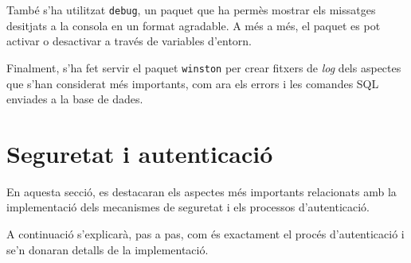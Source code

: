 \documentclass[a4paper,12pt]{ThesisStyle}
\begin{document}
També s'ha utilitzat \texttt{debug}, un paquet que ha permès mostrar els missatges desitjats a la consola en un format agradable. A més a més, el paquet es pot activar o desactivar a través de variables d'entorn.

Finalment, s'ha fet servir el paquet \texttt{winston} per crear fitxers de \textit{log} dels aspectes que s'han considerat més importants, com ara els errors i les comandes SQL enviades a la base de dades.

\section{Seguretat i autenticació}
\label{sec:seguretat}

En aquesta secció, es destacaran els aspectes més importants relacionats amb la implementació dels mecanismes de seguretat i els processos d'autenticació.

A continuació s'explicarà, pas a pas, com és exactament el procés d'autenticació i se'n donaran detalls de la implementació.
\end{document}
